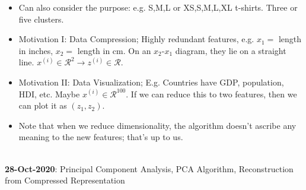 \documentclass[10pt]{article}
\begin{document}
\begin{itemize}
  \item Can also consider the purpose: e.g. S,M,L or XS,S,M,L,XL t-shirts. Three or five clusters.
  \item Motivation I: Data Compression; Highly redundant features,
    e.g. $x_1=$ length in inches, $x_2=$ length in cm. On an
    $x_2$-$x_1$ diagram, they lie on a straight line. $x^{(i)} \in
    \mathcal{R}^2 \rightarrow z^{(i)} \in \mathcal{R}$.
  \item Motivation II: Data Visualization; E.g. Countries have GDP, population, HDI, etc. Maybe $x^{(i)}\in\mathcal{R}^{100}$. If we can reduce this to two features, then we can plot it as $(z_1,z_2)$.
  \item Note that when we reduce dimensionality, the algorithm doesn't
    ascribe any meaning to the new features; that's up to us.
\end{itemize}
\hfill \\ 
{\large \textbf{28-Oct-2020}: Principal Component Analysis, PCA Algorithm, Reconstruction from Compressed Representation}
\end{document}
